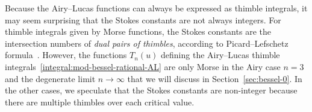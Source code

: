 \documentclass{article}
\newcommand{\laplace}{\mathcal{L}}
\theoremstyle{definition}
\theoremstyle{plain}
\begin{document}
Because the Airy--Lucas functions can always be expressed as thimble integrals, it may seem surprising that the Stokes constants are not always integers. For thimble integrals given by Morse functions, the Stokes constants are the intersection numbers of \textit{dual pairs of thimbles}, according to Picard--Lefschetz formula~\cite[Section 5]{pham}\cite[Chapter~1]{Arnold}. However, the functions $T_n(u)$ defining the Airy--Lucas thimble integrals~\eqref{integral:mod-bessel-rational-AL} are only Morse in the Airy case $n = 3$ and the degenerate limit $n \to \infty$ that we will discuss in Section~\ref{sec:bessel-0}. In the other cases, we speculate that the Stokes constants are non-integer because there are multiple thimbles over each critical value.
%


%
\end{document}
